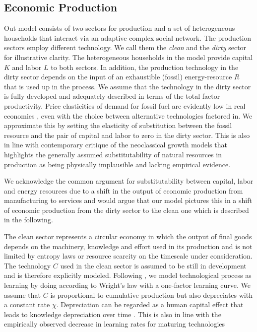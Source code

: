 \subsection{Economic Production}
\label{sec:model_description}

Out model consists of two sectors for production and a set of heterogeneous households that interact via an adaptive complex social network. The production sectors employ different technology. We call them the \textit{clean} and the \textit{dirty} sector for illustrative clarity. The heterogeneous households in the model provide capital $K$ and labor $L$ to both sectors.
In addition, the production technology in the dirty sector depends on the input of an exhaustible (fossil) energy-resource $R$ that is used up in the process. We assume that the technology in the dirty sector is fully developed and adequately described in terms of the total factor productivity. 
Price elasticities of demand for fossil fuel are evidently low in real economies \cite{IMF2011, Hosslinger2017, Labandeira2017}, even with the choice between alternative technologies factored in. We approximate this by setting the elasticity of substitution between the fossil resource and the pair of capital and labor to zero in the dirty sector. This is also in line with contemporary critique of the neoclassical growth models \cite{Daly1997,georgescu1975energy,georgescu1979comments, Ayres2007, Ayres2013} that highlights the generally assumed substitutability of natural resources in production as being physically implausible and lacking empirical evidence.

We acknowledge the common argument for substitutability between capital, labor and energy resources due to a shift in the output of economic production from manufacturing to services and would argue that our model pictures this in a shift of economic production from the dirty sector to the clean one which is described in the following.

The clean sector represents a circular economy in which the output of final goods depends on the machinery, knowledge and effort used in its production and is not limited by entropy laws or resource scarcity on the timescale under consideration. The technology $C$ used in the clean sector is assumed to be still in development and is therefore explicitly modeled.
Following \cite{argote1990learning}, we model technological process as learning by doing according to Wright's law \cite{wright1936factors, Nagy2013} with a one-factor learning curve. We assume that $C$ is proportional to cumulative production but also depreciates with a constant rate $\chi$. Depreciation can be regarded as a human capital effect that leads to knowledge depreciation over time \cite{Kahouli-Brahmi2008}. This is also in line with the empirically observed decrease in learning rates for maturing technologies \cite{argote1990learning}


